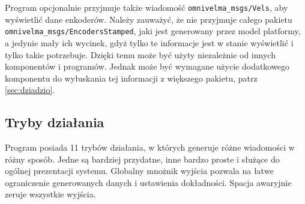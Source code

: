 		Program opcjonalnie przyjmuje także wiadomość \texttt{omnivelma\_msgs/Vels}, aby wyświetlić dane enkoderów.
		Należy zauważyć, że nie przyjmuje całego pakietu \texttt{omnivelma\_msgs/EncodersStamped}, jaki jest generowany przez model platformy,
		a jedynie mały ich wycinek, gdyż tylko te informacje jest w stanie wyświetlić i tylko takie potrzebuje.
		Dzięki temu może być użyty niezależnie od innych komponentów i programów. Jednak może być wymagane użycie dodatkowego komponentu do 
		wyłuskania tej informacji z większego pakietu,
		patrz \ref{sec:dziadzio}.
		
	\subsection{Tryby działania}
		Program posiada 11 trybów działania, w których generuje różne wiadomości w różny sposób.
		Jedne są bardziej przydatne, inne bardzo proste i służące do ogólnej prezentacji systemu.
		Globalny mnożnik wyjścia pozwala na łatwe ograniczenie generowanych danych i ustawienia dokładności. Spacja awaryjnie zeruje wszystkie wyjścia.
